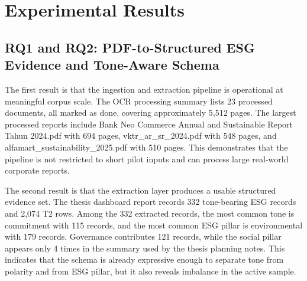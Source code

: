 \section{Experimental Results}
\subsection{RQ1 and RQ2: PDF-to-Structured ESG Evidence and Tone-Aware Schema}

The first result is that the ingestion and extraction pipeline is operational at meaningful corpus scale. The OCR processing summary lists 23 processed documents, all marked as done, covering approximately 5,512 pages. The largest processed reports include Bank Neo Commerce Annual and Sustainable Report Tahun 2024.pdf with 694 pages, vktr\_ar\_sr\_2024.pdf with 548 pages, and alfamart\_sustainability\_2025.pdf with 510 pages. This demonstrates that the pipeline is not restricted to short pilot inputs and can process large real-world corporate reports.

The second result is that the extraction layer produces a usable structured evidence set. The thesis dashboard report records 332 tone-bearing ESG records and 2,074 T2 rows. Among the 332 extracted records, the most common tone is commitment with 115 records, and the most common ESG pillar is environmental with 179 records. Governance contributes 121 records, while the social pillar appears only 4 times in the summary used by the thesis planning notes. This indicates that the schema is already expressive enough to separate tone from polarity and from ESG pillar, but it also reveals imbalance in the active sample.

